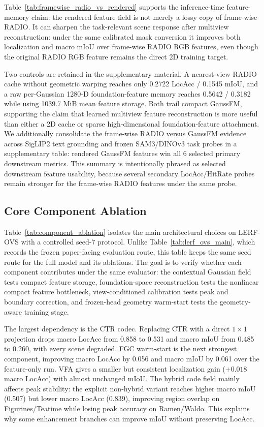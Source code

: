 \documentclass[journal,twoside]{IEEEtran}
\newcommand{\method}{GaussFM}
\begin{document}
Table~\ref{tab:framewise_radio_vs_rendered} supports the inference-time feature-memory
claim: the rendered feature field is not merely a lossy copy of frame-wise RADIO. It
can sharpen the task-relevant scene response after multiview reconstruction:
under the same calibrated mask conversion it improves both localization and macro
mIoU over frame-wise RADIO RGB features, even though the original RADIO RGB
feature remains the direct 2D training target.

Two controls are retained in the supplementary material. A nearest-view RADIO cache
without geometric warping reaches only 0.2722 LocAcc / 0.1545 mIoU, and a raw
per-Gaussian 1280-D foundation-feature memory reaches 0.5642 / 0.3182 while using
1039.7 MiB mean feature storage. Both trail compact \method{}, supporting the
claim that learned multiview feature reconstruction is more useful than either
a 2D cache or sparse high-dimensional foundation-feature attachment.
We additionally consolidate the frame-wise RADIO versus \method{} evidence across
SigLIP2 text grounding and frozen SAM3/DINOv3 task probes in a supplementary table:
rendered \method{} features win all 6 selected primary downstream metrics.
This summary is intentionally phrased as selected downstream feature usability,
because several secondary LocAcc/HitRate probes remain stronger for the
frame-wise RADIO features under the same probe.

\subsection{Core Component Ablation}





Table~\ref{tab:component_ablation} isolates the main architectural choices on
LERF-OVS with a controlled seed-7 protocol. Unlike Table~\ref{tab:lerf_ovs_main}, which
records the frozen paper-facing evaluation route, this table keeps the same
seed route for the full model and its ablations. The goal is to verify whether each
component contributes under the same evaluator: the contextual Gaussian field tests compact feature
storage, foundation-space reconstruction tests the nonlinear compact feature bottleneck,
view-conditioned calibration tests peak and boundary correction, and frozen-head
geometry warm-start tests the geometry-aware training
stage.

The largest dependency is the CTR codec. Replacing CTR with a direct $1\times1$
projection drops macro LocAcc from 0.858 to 0.531 and macro mIoU from 0.485 to
0.260, with every scene degraded. FGC warm-start is the next strongest
component, improving macro LocAcc by 0.056 and macro mIoU by 0.061 over the
feature-only run. VFA gives a smaller but consistent localization gain
($+0.018$ macro LocAcc) with almost unchanged mIoU. The hybrid code field
mainly affects peak stability: the explicit non-hybrid variant reaches higher
macro mIoU (0.507) but lower macro LocAcc (0.839), improving region overlap on
Figurines/Teatime while losing peak accuracy on Ramen/Waldo. This explains why
some enhancement branches can improve mIoU without preserving LocAcc.
\end{document}
